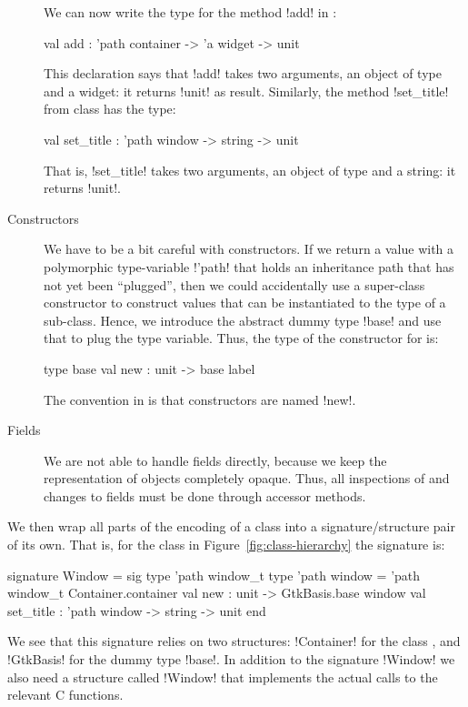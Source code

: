 \documentclass[finalversion]{usetex-v1}
\begin{document}
\begin{description}
  We can now write the type for the method !add! in
  :
\begin{SMLcode}
val add : 'path container -> 'a widget 
                               -> unit
\end{SMLcode}
This declaration says that !add! takes two arguments, an object of type
 and a widget: it returns !unit! as result.
Similarly,  the method !set_title! from class
 has the type:
\begin{SMLcode}
val set_title : 'path window -> string 
                               -> unit
\end{SMLcode}
That is, !set_title! takes two arguments, an object of type 
 and a string: it returns !unit!.


\item[Constructors] We have to be a bit careful with constructors.  If
  we return a value with a polymorphic type-variable !'path!
  that holds an inheritance path that has not yet been ``plugged'',
  then we could accidentally use a super-class constructor to construct
  values that can be instantiated to the type of a sub-class.  Hence,
  we introduce the abstract dummy type !base! and use that to plug the
  type variable.  Thus, the type of the constructor for
   is:
\begin{SMLcode}
type base
val new : unit -> base label
\end{SMLcode}
The convention in \gtk is that constructors are named !new!.

\item[Fields] We are not able to handle fields directly, because we
  keep the representation of objects completely opaque.  Thus, all
  inspections of and changes to fields must be done through accessor
  methods.

\end{description}

We then wrap all parts of the encoding of a class into a
 signature/structure
 pair of its own.  That is, for the class 
in Figure~\ref{fig:class-hierarchy} the \sml signature is:
\begin{SMLcode}
signature Window =
sig
  type 'path window_t
  type 'path window = 
      'path window_t Container.container
  val new : unit -> GtkBasis.base window
  val set_title : 'path window -> string 
                                 -> unit
end
\end{SMLcode}
We see that this signature relies on two structures:
!Container! for the class , and !GtkBasis! for the dummy
type !base!.  In addition to the signature !Window! we also need a
structure called !Window! that implements the actual calls to the
relevant \gtk C functions.
\end{document}
